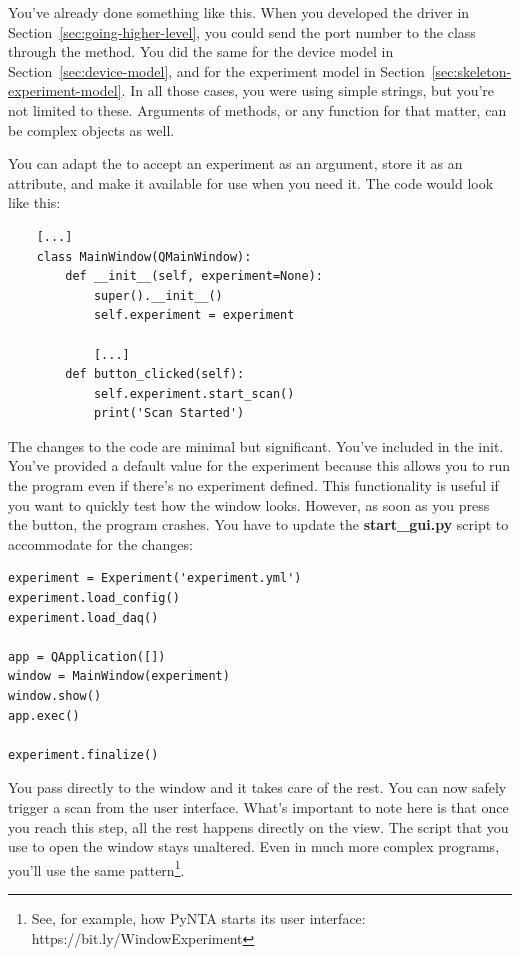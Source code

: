 You've already done something like this. When you developed the driver in Section~\ref{sec:going-higher-level}, you could send the port number to the class through the  method. You did the same for the device model in Section~\ref{sec:device-model}, and for the experiment model in Section~\ref{sec:skeleton-experiment-model}. In all those cases, you were using simple strings, but you're not limited to these. Arguments of methods, or any function for that matter, can be complex objects as well.

You can adapt the  to accept an experiment as an argument, store it as an attribute, and make it available for use when you need it. The code would look like this:

\begin{verbatim}
    [...]
    class MainWindow(QMainWindow):
        def __init__(self, experiment=None):
            super().__init__()
            self.experiment = experiment

            [...]
        def button_clicked(self):
            self.experiment.start_scan()
            print('Scan Started')
\end{verbatim}

The changes to the code are minimal but significant. You've included  in the init. You've provided a default value for the experiment because this allows you to run the program even if there's no experiment defined. This functionality is useful if you want to quickly test how the window looks. However, as soon as you press the button, the program crashes. You have to update the \textbf{start\_gui.py} script to accommodate for the changes:

\begin{verbatim}
experiment = Experiment('experiment.yml')
experiment.load_config()
experiment.load_daq()

app = QApplication([])
window = MainWindow(experiment)
window.show()
app.exec()

experiment.finalize()
\end{verbatim}

You pass  directly to the window and it takes care of the rest. You can now safely trigger a scan from the user interface. What's important to note here is that once you reach this step, all the rest happens directly on the view. The script that you use to open the window stays unaltered. Even in much more complex programs, you'll use the same pattern\footnote{See, for example, how PyNTA starts its user interface: https://bit.ly/WindowExperiment}.

